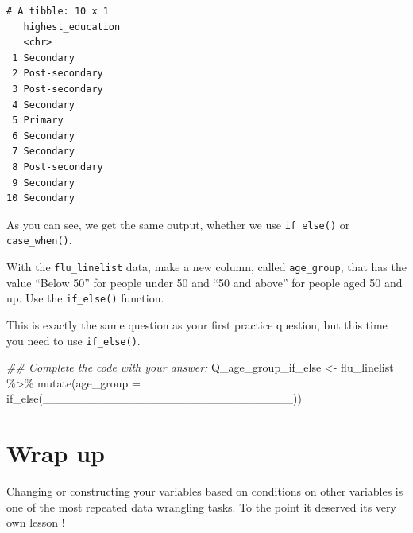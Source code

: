 \documentclass[
  letterpaper,
  DIV=11,
  numbers=noendperiod]{scrreprt}
\newenvironment{Shaded}{\begin{snugshade}}{\end{snugshade}}
\newcommand{\AttributeTok}[1]{\textcolor[rgb]{0.40,0.45,0.13}{#1}}
\newcommand{\DocumentationTok}[1]{\textcolor[rgb]{0.37,0.37,0.37}{\textit{#1}}}
\newcommand{\FunctionTok}[1]{\textcolor[rgb]{0.28,0.35,0.67}{#1}}
\newcommand{\NormalTok}[1]{\textcolor[rgb]{0.00,0.23,0.31}{#1}}
\newcommand{\OtherTok}[1]{\textcolor[rgb]{0.00,0.23,0.31}{#1}}
\newcommand{\SpecialCharTok}[1]{\textcolor[rgb]{0.37,0.37,0.37}{#1}}
\begin{document}
\begin{verbatim}
# A tibble: 10 x 1
   highest_education
   <chr>            
 1 Secondary        
 2 Post-secondary   
 3 Post-secondary   
 4 Secondary        
 5 Primary          
 6 Secondary        
 7 Secondary        
 8 Post-secondary   
 9 Secondary        
10 Secondary        
\end{verbatim}

As you can see, we get the same output, whether we use
\texttt{if\_else()} or \texttt{case\_when()}.

\begin{tcolorbox}[enhanced jigsaw, title=\textcolor{quarto-callout-tip-color}{\faLightbulb}\hspace{0.5em}{Practice}, colbacktitle=quarto-callout-tip-color!10!white, leftrule=.75mm, arc=.35mm, opacityback=0, bottomrule=.15mm, rightrule=.15mm, toptitle=1mm, breakable, toprule=.15mm, colback=white, coltitle=black, colframe=quarto-callout-tip-color-frame, bottomtitle=1mm, titlerule=0mm, left=2mm, opacitybacktitle=0.6]

With the \texttt{flu\_linelist} data, make a new column, called
\texttt{age\_group}, that has the value ``Below 50'' for people under 50
and ``50 and above'' for people aged 50 and up. Use the
\texttt{if\_else()} function.

This is exactly the same question as your first practice question, but
this time you need to use \texttt{if\_else()}.

\begin{Shaded}
\begin{Highlighting}[]
\DocumentationTok{\#\# Complete the code with your answer:}
\NormalTok{Q\_age\_group\_if\_else }\OtherTok{\textless{}{-}} 
\NormalTok{  flu\_linelist }\SpecialCharTok{\%\textgreater{}\%} 
  \FunctionTok{mutate}\NormalTok{(}\AttributeTok{age\_group =} \FunctionTok{if\_else}\NormalTok{(\_\_\_\_\_\_\_\_\_\_\_\_\_\_\_\_\_\_\_\_\_\_\_\_\_\_\_\_\_\_))}
\end{Highlighting}
\end{Shaded}

\end{tcolorbox}

\section{Wrap up}\label{wrap-up-5}

Changing or constructing your variables based on conditions on other
variables is one of the most repeated data wrangling tasks. To the point
it deserved its very own lesson !
\end{document}
